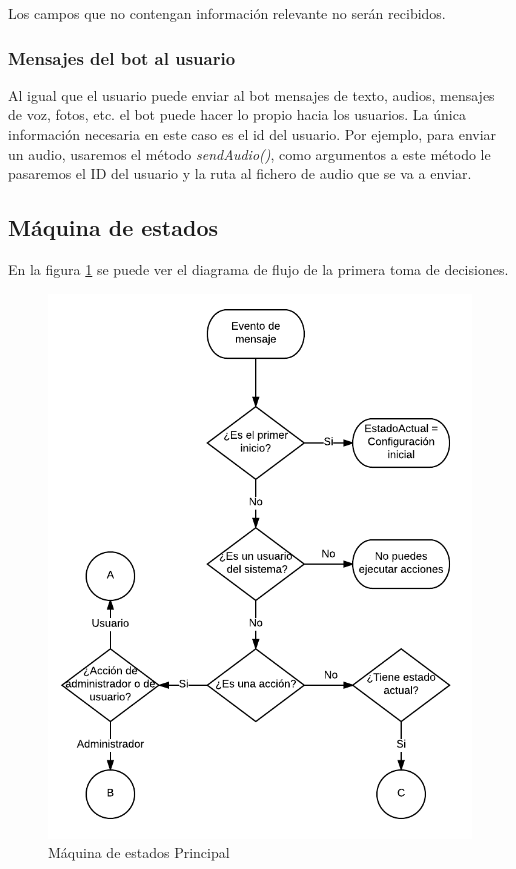\documentclass[10pt,journal,compsoc]{IEEEtran}
\begin{document}
Los campos que no contengan información relevante no serán recibidos.

\subsubsection{Mensajes del bot al usuario}
Al igual que el usuario puede enviar al bot mensajes de texto, audios, mensajes 
de voz, fotos, etc. el bot puede hacer lo propio hacia los usuarios. La única 
información necesaria en este caso es el id del usuario.
Por ejemplo, para enviar un audio, usaremos el método \textit{sendAudio()}, como 
argumentos a este método le pasaremos el ID del usuario y la ruta al fichero de 
audio que se va a enviar.


\subsection{Máquina de estados}
En la figura \ref{fig:MaqEstPrin} se puede ver el diagrama de flujo de la primera toma de decisiones. 
\begin{figure}[h]
\centering
\includegraphics[scale=0.5]{MaqEstPrin}
\caption{Máquina de estados Principal}
\label{fig:MaqEstPrin}
\end{figure}
\end{document}
